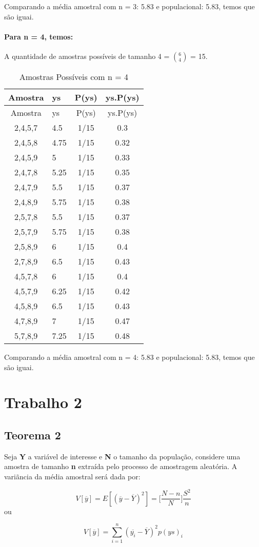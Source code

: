 \documentclass[]{article}
\let\oldparagraph\paragraph
\renewcommand{\paragraph}[1]{\oldparagraph{#1}\mbox{}}
\begin{document}
Comparando a média amostral com n = 3: 5.83 e populacional: 5.83, temos
que são iguai.

\paragraph{Para n = 4, temos:}\label{para-n-4-temos}

A quantidade de amostras possíveis de tamanho 4 = \({6\choose 4}\) = 15.

\begin{longtable}[]{@{}clcc@{}}
\caption{Amostras Possíveis com n = 4}\tabularnewline
\toprule
Amostra & ys & P(ys) & ys.P(ys)\tabularnewline
\midrule
\endfirsthead
\toprule
Amostra & ys & P(ys) & ys.P(ys)\tabularnewline
\midrule
\endhead
2,4,5,7 & 4.5 & 1/15 & 0.3\tabularnewline
2,4,5,8 & 4.75 & 1/15 & 0.32\tabularnewline
2,4,5,9 & 5 & 1/15 & 0.33\tabularnewline
2,4,7,8 & 5.25 & 1/15 & 0.35\tabularnewline
2,4,7,9 & 5.5 & 1/15 & 0.37\tabularnewline
2,4,8,9 & 5.75 & 1/15 & 0.38\tabularnewline
2,5,7,8 & 5.5 & 1/15 & 0.37\tabularnewline
2,5,7,9 & 5.75 & 1/15 & 0.38\tabularnewline
2,5,8,9 & 6 & 1/15 & 0.4\tabularnewline
2,7,8,9 & 6.5 & 1/15 & 0.43\tabularnewline
4,5,7,8 & 6 & 1/15 & 0.4\tabularnewline
4,5,7,9 & 6.25 & 1/15 & 0.42\tabularnewline
4,5,8,9 & 6.5 & 1/15 & 0.43\tabularnewline
4,7,8,9 & 7 & 1/15 & 0.47\tabularnewline
5,7,8,9 & 7.25 & 1/15 & 0.48\tabularnewline
\bottomrule
\end{longtable}

Comparando a média amostral com n = 4: 5.83 e populacional: 5.83, temos
que são iguai.

\section{Trabalho 2}\label{trabalho-2}

\subsection{Teorema 2}\label{teorema-2}

Seja \textbf{Y} a variável de interesse e \textbf{N} o tamanho da
população, considere uma amostra de tamanho \textbf{n} extraída pelo
processo de amostragem aleatória. A variãncia da média amostral será
dada por:

\[
V[\overline{y}]=E[(\overline{y}-\overline{Y})^2]=\bigg[ \dfrac{N-n}{N}\bigg] \dfrac{S^2}{n}
\] ou

\[
V[\overline{y}]=\sum_{i=1}^n(\overline{y_i}-\overline{Y})^2p(ys)_i
\]
\end{document}
